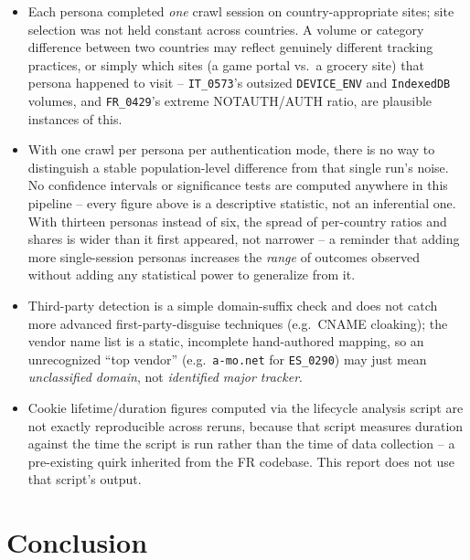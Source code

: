 \documentclass[11pt,a4paper]{article}
\newcommand{\code}[1]{\texttt{#1}}
\begin{document}
\begin{itemize}[leftmargin=1.3cm]
  \item Each persona completed \emph{one} crawl session on
    country-appropriate sites; site selection was not held constant across
    countries. A volume or category difference between two countries may
    reflect genuinely different tracking practices, or simply which sites
    (a game portal vs.\ a grocery site) that persona happened to visit --
    \code{IT\_0573}'s outsized \code{DEVICE\_ENV} and \code{IndexedDB}
    volumes, and \code{FR\_0429}'s extreme NOTAUTH/AUTH ratio, are
    plausible instances of this.
  \item With one crawl per persona per authentication mode, there is no
    way to distinguish a stable population-level difference from that
    single run's noise. No confidence intervals or significance tests are
    computed anywhere in this pipeline -- every figure above is a
    descriptive statistic, not an inferential one. With thirteen personas
    instead of six, the spread of per-country ratios and shares is wider
    than it first appeared, not narrower -- a reminder that adding more
    single-session personas increases the \emph{range} of outcomes observed
    without adding any statistical power to generalize from it.
  \item Third-party detection is a simple domain-suffix check and does not
    catch more advanced first-party-disguise techniques (e.g.\ CNAME
    cloaking); the vendor name list is a static, incomplete hand-authored
    mapping, so an unrecognized ``top vendor'' (e.g.\ \code{a-mo.net} for
    \code{ES\_0290}) may just mean \emph{unclassified domain}, not
    \emph{identified major tracker}.
  \item Cookie lifetime/duration figures computed via the lifecycle
    analysis script are not exactly reproducible across reruns, because
    that script measures duration against the time the script is run
    rather than the time of data collection -- a pre-existing quirk
    inherited from the FR codebase. This report does not use that script's
    output.
\end{itemize}

\section{Conclusion}
\end{document}
